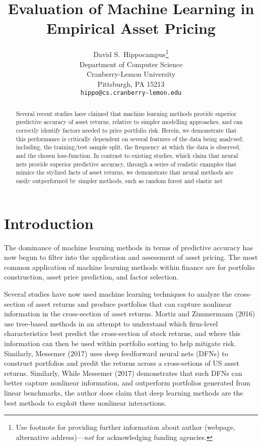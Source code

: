 \documentclass{article}
\title{Evaluation of Machine Learning in Empirical Asset Pricing}
\author{%
  David S.~Hippocampus\thanks{Use footnote for providing further information
    about author (webpage, alternative address)---\emph{not} for acknowledging
    funding agencies.} \\
  Department of Computer Science\\
  Cranberry-Lemon University\\
  Pittsburgh, PA 15213 \\
  \texttt{hippo@cs.cranberry-lemon.edu} \\
}
\begin{document}
\maketitle

\begin{abstract}
  Several recent studies have claimed that machine learning methods provide superior predictive accuracy of asset returns, relative to simpler modelling approaches, and can correctly identify factors needed to price portfolio risk. Herein, we demonstrate that this performance is critically dependent on several features of the data being analysed; including, the training/test sample split, the frequency at which the data is observed, and the chosen loss-function. In contrast to existing studies, which claim that neural nets provide superior predictive accuracy, through a series of realistic examples that mimics the stylized facts of asset returns, we demonstrate that neural methods are easily outperformed by simpler methods, such as random forest and elastic net
\end{abstract}

\section{Introduction}
The dominance of machine learning methods in terms of predictive accuracy has now begun to filter into the application and assessment of asset pricing. The most common application of machine learning methods within finance are for portfolio construction, asset price prediction, and factor selection. 

Several studies have now used machine learning techniques to analyze the cross-section of asset returns and produce portfolios that can capture nonlinear information in the cross-section of asset returns. Mortiz and Zimmermann (2016) use tree-based methods in an attempt to understand which firm-level characteristics best predict the cross-section of stock returns, and where this information can then be used within portfolio sorting to help mitigate risk. Similarly, Messemer (2017) uses deep feedforward neural nets (DFNs) to construct portfolios and predit the returns across a cross-setions of US asset returns. Similarly, While Messemer (2017) demonstrates that such DFNs can better capture nonlinear information, and outperform portfolios generated from linear benchmarks, the author does claim that deep learning methods are the best methods to exploit these nonlinear interactions. 
\end{document}
